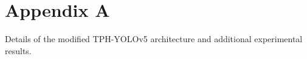 \chapter{Appendix A}
Details of the modified TPH-YOLOv5 architecture and additional experimental results.
